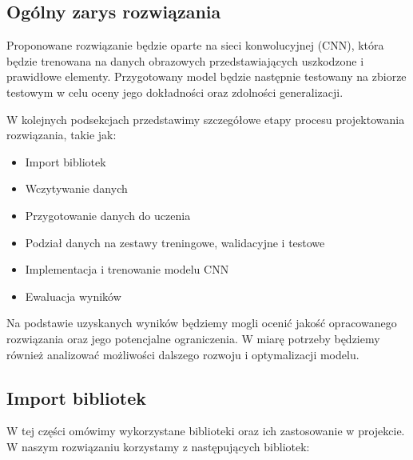 \subsection{Ogólny zarys rozwiązania}
Proponowane rozwiązanie będzie oparte na sieci konwolucyjnej (CNN), która będzie trenowana na danych obrazowych przedstawiających uszkodzone i prawidłowe elementy. Przygotowany model będzie następnie testowany na zbiorze testowym w celu oceny jego dokładności oraz zdolności generalizacji.

W kolejnych podsekcjach przedstawimy szczegółowe etapy procesu projektowania rozwiązania, takie jak:

\begin{itemize}
\item Import bibliotek
\item Wczytywanie danych
\item Przygotowanie danych do uczenia
\item Podział danych na zestawy treningowe, walidacyjne i testowe
\item Implementacja i trenowanie modelu CNN
\item Ewaluacja wyników
\end{itemize}

Na podstawie uzyskanych wyników będziemy mogli ocenić jakość opracowanego rozwiązania oraz jego potencjalne ograniczenia. W miarę potrzeby będziemy również analizować możliwości dalszego rozwoju i optymalizacji modelu.

\subsection{Import bibliotek}
W tej części omówimy wykorzystane biblioteki oraz ich zastosowanie w projekcie. W naszym rozwiązaniu korzystamy z następujących bibliotek:

